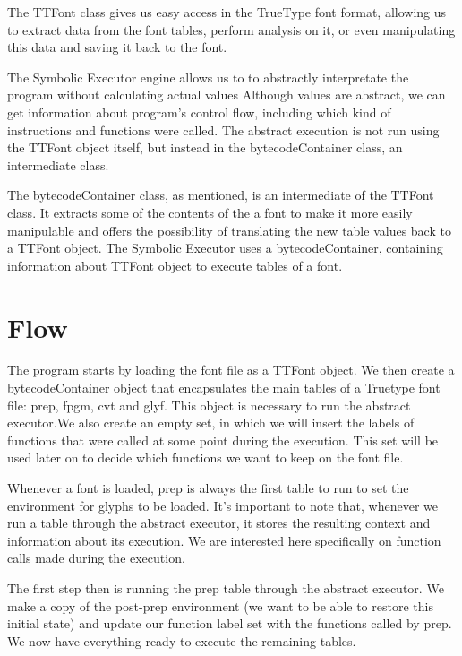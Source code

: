 \documentclass[12pt]{article}
\begin{document}
The TTFont class gives us easy access in the TrueType font format,
allowing us to extract data from the font tables, perform analysis on
it, or even manipulating this data and saving it back to the font. 

The Symbolic Executor engine allows us to to abstractly
interpretate the program without calculating actual values Although
values are abstract,  we can get information about program's control
flow, including which kind of instructions and functions were called.
The abstract execution is not run using the TTFont object itself, but
instead in the bytecodeContainer class, an intermediate class.

The bytecodeContainer class, as mentioned, is an intermediate of
the TTFont class. It extracts some of the contents of the a font to make
it more easily manipulable and offers the possibility of translating the
new table values back to a TTFont object. The Symbolic Executor uses a
bytecodeContainer, containing information about TTFont object to execute
tables of a font.

\section{Flow}

The program starts by loading the font file as a TTFont object.
We then create a bytecodeContainer object that encapsulates the main
tables of a Truetype font file: prep, fpgm, cvt and glyf. This object 
is necessary to run the abstract executor.We also create an empty set, 
in which we will insert the labels of functions that were called at some 
point during the execution. This set will be used later on to decide 
which functions we want to keep on the font file.

Whenever a font is loaded, prep is always the first table to run to 
set the environment for glyphs to be loaded. It's important to note that, 
whenever we run a table through the abstract executor, it stores the
resulting context and information about its execution. We are interested 
here specifically on function calls made during the execution.

The first step then is running the prep table through the abstract 
executor. We make a copy of the post-prep environment (we want to be
able to restore this initial state) and update our function label
set with the functions called by prep. We now have everything ready to
execute the remaining tables.
\end{document}
